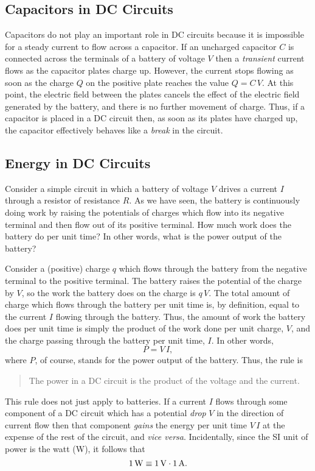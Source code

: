\subsection{Capacitors in DC Circuits}
Capacitors do not play an important role in DC circuits because it
is impossible for a steady current to flow across  a capacitor. If an
uncharged 
capacitor $C$ is connected across the terminals of a battery of voltage $V$
then a {\em transient}\/ current flows as the capacitor plates charge up.
However, the current stops flowing as soon as the charge $Q$ on the positive plate
reaches the value $Q=C\,V$. At this point, the electric field between the
plates cancels  the effect of the electric field generated by the battery,
and there is no further movement of charge. Thus, if a capacitor is
placed in a DC circuit then, as soon as its plates have charged up, the capacitor
effectively behaves like a {\em break}\/ in the circuit. 

\subsection{Energy in DC Circuits}
Consider a simple circuit in which a battery of voltage $V$ drives a
current $I$ through a resistor of resistance $R$. 
As we have seen, the battery is continuously doing work 
by raising the potentials
of charges which flow into its negative terminal and then flow out of its
positive terminal. How much work does the battery do per unit time?
In other words, what is the power output of the battery? 

Consider a (positive) charge $q$ which flows through the battery from the  negative
terminal to the positive terminal. The battery raises the potential of the
charge by $V$, so the work the battery does on the charge is $q\,V$. 
The total amount of charge which flows through the battery per unit time is,
by definition, equal to the current $I$ flowing through the battery. Thus, the
amount of work the battery does per unit time is simply the product of
the work done  per unit 
charge, $V$, and the charge passing through the battery per unit
time, $I$. In other words,
\begin{equation}
P = V\,I,
\end{equation}
where $P$, of course, stands for the power output of the battery. Thus,
the rule is
\begin{quote}
{\sf The power in a DC circuit is the product of the voltage and the current}.
\end{quote}
This rule does not just apply to batteries. If a current $I$ flows through
some component of a DC circuit which has a potential {\em drop}\/ $V$ in the
direction of current flow then that component {\em gains}\/ the energy per unit time
$V\,I$ at the expense of the rest of the circuit, and {\em vice versa}. 
Incidentally, since the SI unit of power is the watt (W), it follows that 
\begin{equation}
1\,{\rm W} \equiv 1\,{\rm V}\cdot 1\,{\rm A}.
\end{equation}

